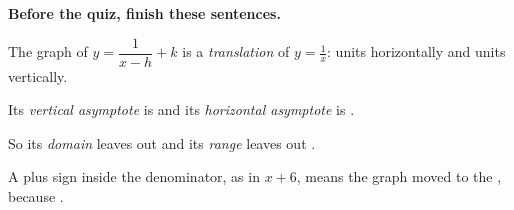 \vspace{6pt}
\textbf{Before the quiz, finish these sentences.}

The graph of $y=\dfrac{1}{x-h}+k$ is a \emph{translation} of $y=\frac{1}{x}$: \blank[1cm] units horizontally and \blank[1cm] units vertically.

Its \emph{vertical asymptote} is \blank[2cm] and its \emph{horizontal asymptote} is \blank[2cm].

So its \emph{domain} leaves out \blank[2cm] and its \emph{range} leaves out \blank[2cm].

A plus sign inside the denominator, as in $x+6$, means the graph moved to the \blank[2cm], because \blank[6cm].


